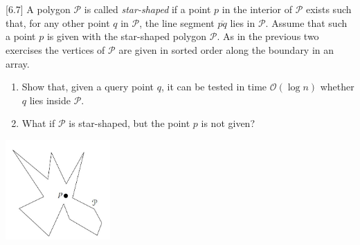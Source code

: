 \documentclass[11pt]{article}
\newenvironment{Quest}{ \begin{framed}} {\end{framed}  \vspace{0.2 cm}}
\begin{document}
\FloatBarrier
\newpage














\section{}

\begin{Quest}

[6.7] A polygon $\mathcal{P}$ is called \textit{star-shaped} if a point $p$ in the interior of $\mathcal{P}$ exists such that, for any other point $q$ in $\mathcal{P}$, the line segment $\overline{pq}$ lies in $\mathcal{P}$. Assume that such a point $p$ is given with the star-shaped polygon $\mathcal{P}$. As in the previous two exercises the vertices of $\mathcal{P}$ are given in sorted order along the boundary in an array. 
\begin{enumerate}
    \item Show that, given a query point $q$, it can be tested in time $\mathcal{O}(\log n)$ whether $q$ lies inside $\mathcal{P}$. 
    \item What if $\mathcal{P}$ is star-shaped, but the point $p$ is not given?
\end{enumerate}

\includegraphics[width=0.3\textwidth]{exercise6}

\end{Quest}
\end{document}
